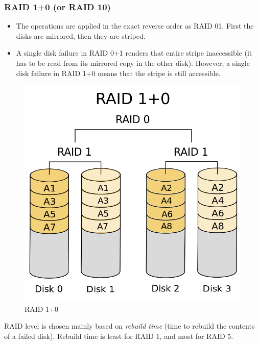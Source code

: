 \documentclass{article}
\theoremstyle{plain}
\theoremstyle{definition}
\begin{document}
\subsubsection{RAID 1+0 (or RAID 10)}
\begin{itemize}
    \item The operations are applied in the exact reverse order as RAID 01. First the disks are mirrored, then they are striped. 
    
    \item A single disk failure in RAID 0+1 renders that entire stripe inaccessible (it has to be read from its mirrored copy in the other disk). However, a single disk failure in RAID 1+0 means that the stripe is still accessible. 
\end{itemize}

\begin{figure}[!h]
    \centering
    \includegraphics[scale=0.2]{raid10.png}
    \caption{RAID 1+0}
    \label{fig:my_label_8}
\end{figure}

RAID level is chosen mainly based on \textit{rebuild time} (time to rebuild the contents of a failed disk). Rebuild time is least for RAID 1, and most for RAID 5.\\
\end{document}
